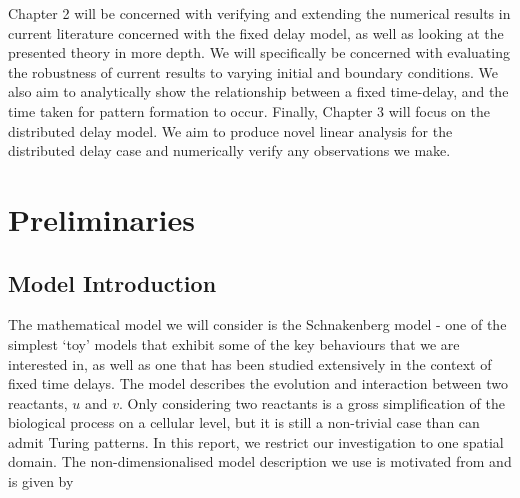 \documentclass[12pt]{report}
\begin{document}
Chapter 2 will be concerned with verifying and extending the numerical results in current literature concerned with the fixed delay model, as well as looking at the presented theory in more depth. We will specifically be concerned with evaluating the robustness of current results to varying initial and boundary conditions. We also aim to analytically show the relationship between a fixed time-delay, and the time taken for pattern formation to occur. Finally, Chapter 3 will focus on the distributed delay model. We aim to produce novel linear analysis for the distributed delay case and numerically verify any observations we make.

\section{Preliminaries}
\subsection{Model Introduction}
The mathematical model we will consider is the Schnakenberg model \cite{schnakenberg} - one of the simplest `toy' models that exhibit some of the key behaviours that we are interested in, as well as one that has been studied extensively in the context of fixed time delays. The model describes the evolution and interaction between two reactants, $u$ and $v$. Only considering two reactants is a gross simplification of the biological process on a cellular level, but it is still a non-trivial case than can admit Turing patterns. In this report, we restrict our investigation to one spatial domain. The non-dimensionalised model description we use is motivated from \cite{gaffmonk} and is given by
\end{document}
